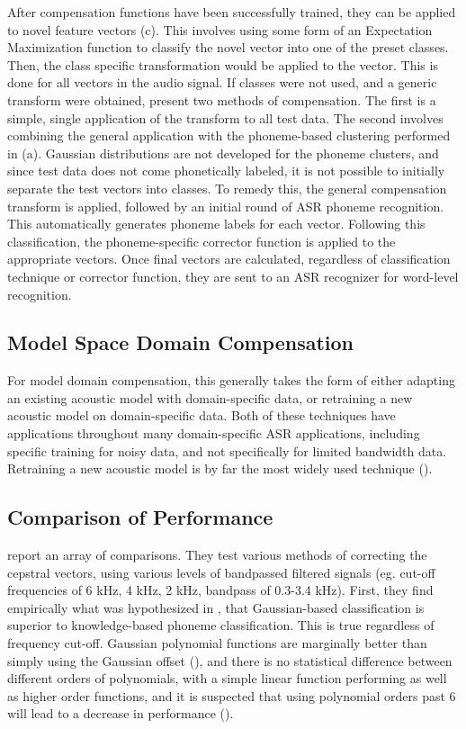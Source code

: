 After compensation functions have been successfully trained, they can be applied to novel feature vectors (c).  This involves using some form of an Expectation Maximization function to classify the novel vector into one of the preset classes.  Then, the class specific transformation would be applied to the vector.  This is done for all vectors in the audio signal.  If classes were not used, and a generic transform were obtained, \cite{morales:09} present two methods of compensation.  The first is a simple, single application of the transform to all test data.  The second involves combining the general application with the phoneme-based clustering performed in (a).  Gaussian distributions are not developed for the phoneme clusters, and since test data does not come phonetically labeled, it is not possible to initially separate the test vectors into classes.  To remedy this, the general compensation transform is applied, followed by an initial round of ASR phoneme recognition.  This automatically generates phoneme labels for each vector.  Following this classification, the phoneme-specific corrector function is applied to the appropriate vectors.  Once final vectors are calculated, regardless of classification technique or corrector function, they are sent to an ASR recognizer for word-level recognition.


\subsection{Model Space Domain Compensation}\label{sec:mod-space-comp}

For model domain compensation, this generally takes the form of either adapting an existing acoustic model with domain-specific data, or retraining a new acoustic model on domain-specific data.  Both of these techniques have applications throughout many domain-specific ASR applications, including specific training for noisy data, and not specifically for limited bandwidth data.  Retraining a new acoustic model is by far the most widely used technique (\cite{morales:09}).

\subsection{Comparison of Performance}

\cite{morales:09} report an array of comparisons.  They test various methods of correcting the cepstral vectors, using various levels of bandpassed filtered signals (eg. cut-off frequencies of 6 kHz, 4 kHz, 2 kHz, bandpass of 0.3-3.4 kHz).  First, they find empirically what was hypothesized in \cite{morales:05b}, that Gaussian-based classification is superior to knowledge-based phoneme classification.  This is true regardless of frequency cut-off.  Gaussian polynomial functions are marginally better than simply using the Gaussian offset (\cite{morales:05b}), and there is no statistical difference between different orders of polynomials, with a simple linear function performing as well as higher order functions, and it is suspected that using polynomial orders past 6 will lead to a decrease in performance (\cite{morales:09}).


